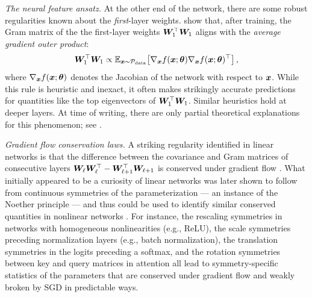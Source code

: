 \textit{The neural feature ansatz.}
At the other end of the network, there are some robust regularities known about the \textit{first}-layer weights.
\citet{neuralFeatureAnsatz} show that, after training, the Gram matrix of the the first-layer weights ${\bm{W}}_1^\top {\bm{W}}_1$ aligns with the \textit{average gradient outer product}:
\begin{equation}
    {\bm{W}}_1^\top {\bm{W}}_1
    \propto
    \mathbb{E}_{{\bm{x}} \sim \mathcal{P}_\text{data}} \! \left[ 
    \nabla_{{\bm{x}}} f({\bm{x}}; {\bm{\theta}})
    \nabla_{{\bm{x}}} f({\bm{x}}; {\bm{\theta}})^\top
     \right],
\end{equation}
where $\nabla_{{\bm{x}}} f({\bm{x}}; {\bm{\theta}})$ denotes the Jacobian of the network with respect to ${\bm{x}}$.
While this rule is heuristic and inexact, it often makes strikingly accurate predictions for quantities like the top eigenvectors of ${\bm{W}}_1^\top {\bm{W}}_1$.
Similar heuristics hold at deeper layers.
At time of writing, there are only partial theoretical explanations for this phenomenon; see \citet{ziyin2024formation,featuresAtConvergenceTheorem}.



\textit{Gradient flow conservation laws.}
A striking regularity identified in linear networks is that the difference between the covariance and Gram matrices of consecutive layers ${\bm{W}}_\ell{\bm{W}}_\ell^\top - {\bm{W}}_{\ell + 1}^\top{\bm{W}}_{\ell + 1}$ is conserved under gradient flow \citep{saxe2014exact,du2018algorithmic, arora2019convergenceanalysisgradientdescent}.
What initially appeared to be a curiosity of linear networks was later shown to follow from continuous symmetries of the parameterization --- an instance of the Noether principle --- and thus could be used to identify similar conserved quantities in nonlinear networks \citep{kunin2021neural, tanaka2021noether, marcotte2024abidelawfollowflow, marcotte2024momentumconservationlawseuclidean}.
For instance, the rescaling symmetries in networks with homogeneous nonlinearities (e.g., ReLU), the scale symmetries preceding normalization layers (e.g., batch normalization), the translation symmetries in the logits preceding a softmax, and the rotation symmetries between key and query matrices in attention all lead to symmetry-specific statistics of the parameters that are conserved under gradient flow and weakly broken by SGD in predictable ways.




